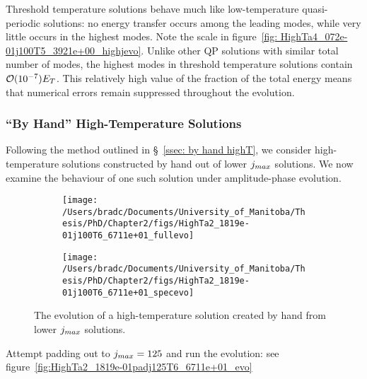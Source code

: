 \documentclass[../PhD.tex]{subfiles}
\begin{document}
Threshold temperature solutions behave much like low-temperature quasi-periodic solutions: no energy transfer occurs among the leading modes, while very little occurs in the highest modes. Note the scale in figure~\ref{fig: HighTa4_072e-01j100T5_3921e+00_highjevo}. Unlike other QP solutions with similar total number of modes, the highest modes in threshold temperature solutions contain $\mathcal O(10^{-7}) E_T $. This relatively high value of the fraction of the total energy means that numerical errors remain suppressed throughout the evolution.


\subsubsection{``By Hand'' High-Temperature Solutions}

Following the method outlined in \S~\!\ref{ssec: by hand highT}, we consider high-temperature solutions constructed by hand out of lower $j_{max}$ solutions. We now examine the behaviour of one such solution under amplitude-phase evolution. 

\begin{figure}[h!]
	\centering
	\begin{subfigure}[t]{0.45\textwidth}
		\texttt{[image: /Users/bradc/Documents/University\_of\_Manitoba/Thesis/PhD/Chapter2/figs/HighTa2\_1819e-01j100T6\_6711e+01\_fullevo]}
	\end{subfigure}
	\;
	\begin{subfigure}[t]{0.45\textwidth}
		\texttt{[image: /Users/bradc/Documents/University\_of\_Manitoba/Thesis/PhD/Chapter2/figs/HighTa2\_1819e-01j100T6\_6711e+01\_specevo]}
	\end{subfigure}
	\caption{The evolution of a high-temperature solution created by hand from lower $j_{max}$ solutions.}
	\label{fig: HighTa2_1819e-01j100T6_6711e+01}
\end{figure}

Attempt padding out to $j_{max} = 125$ and run the evolution: see figure~\ref{fig:HighTa2_1819e-01padj125T6_6711e+01_evo}
\end{document}
